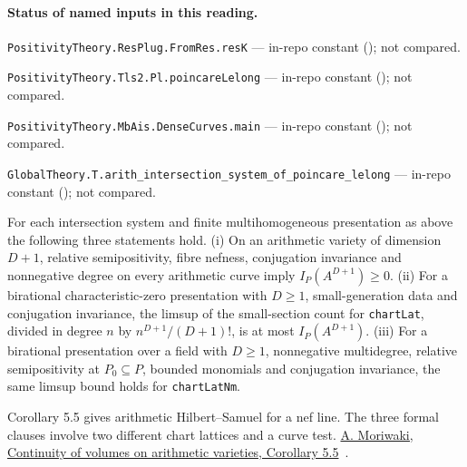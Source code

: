 

\paragraph{Status of named inputs in this reading.}
\noindent\nolinkurl{PositivityTheory.ResPlug.FromRes.resK} --- in-repo constant (); not compared.\par
\noindent\nolinkurl{PositivityTheory.Tls2.Pl.poincareLelong} --- in-repo constant (); not compared.\par
\noindent\nolinkurl{PositivityTheory.MbAis.DenseCurves.main} --- in-repo constant (); not compared.\par
\noindent\nolinkurl{GlobalTheory.T.arith_intersection_system_of_poincare_lelong} --- in-repo constant (); not compared.\par

\begin{formalstatement}\label{sub:T18}

For each intersection system and finite multihomogeneous presentation as
above the following three statements hold.
(i) On an arithmetic variety of dimension $D+1$, relative semipositivity,
fibre nefness, conjugation invariance and nonnegative degree on every
arithmetic curve imply $I_P(A^{D+1})\ge0$.
(ii) For a birational characteristic-zero presentation with $D\ge1$,
small-generation data and conjugation invariance, the limsup of the
small-section count for \nolinkurl{chartLat}, divided in degree $n$ by
$n^{D+1}/(D+1)!$, is at most $I_P(A^{D+1})$.
(iii) For a birational presentation over a field with $D\ge1$, nonnegative
multidegree, relative semipositivity at $P_0\subseteq P$, bounded monomials
and conjugation invariance, the same limsup bound holds for
\nolinkurl{chartLatNm}.

\end{formalstatement}

\noindent Corollary 5.5 gives arithmetic Hilbert--Samuel for a nef line. The three formal clauses involve two different chart lattices and a curve test. \href{https://arxiv.org/pdf/math/0612269}{A. Moriwaki, Continuity of volumes on arithmetic varieties, Corollary 5.5}~\cite{r21-moriwaki}.
